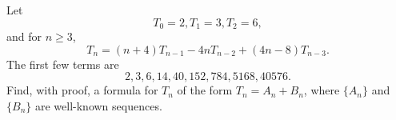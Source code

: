 Let
\[
T_0 = 2, T_1 = 3, T_2 = 6,
\]
and for $n \geq 3$,
\[
T_n = (n+4)T_{n-1} - 4n T_{n-2} + (4n-8) T_{n-3}.
\]
The first few terms are
\[
2, 3, 6, 14, 40, 152, 784, 5168, 40576.
\]
Find, with proof, a formula for $T_n$ of the form $T_n = A_n + B_n$,
where $\{A_n\}$ and $\{B_n\}$ are well-known sequences.
